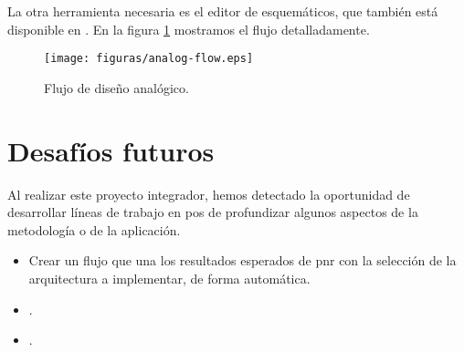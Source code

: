 La otra herramienta necesaria es el editor de esquemáticos, que también está disponible en . En la figura \ref{fig:aflow} mostramos el flujo detalladamente.


\begin{figure}[h]
  \centering
\texttt{[image: figuras/analog-flow.eps]}
  \caption{Flujo de diseño analógico.}
\label{fig:aflow}
\end{figure}
\section{Desafíos futuros}
Al realizar este proyecto integrador, hemos detectado la oportunidad de desarrollar líneas de trabajo en pos de profundizar algunos aspectos de la metodología o de la aplicación.  
\begin{itemize}
\item Crear un flujo que una los resultados esperados de \gls{pnr} con la selección de la arquitectura a implementar, de forma automática.
\item .
\item .
\end{itemize}







